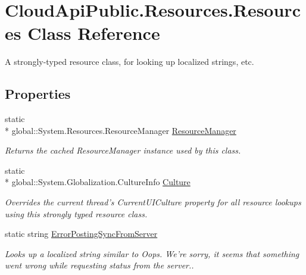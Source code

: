 \hypertarget{class_cloud_api_public_1_1_resources_1_1_resources}{\section{Cloud\-Api\-Public.\-Resources.\-Resources Class Reference}
\label{class_cloud_api_public_1_1_resources_1_1_resources}
}


A strongly-\/typed resource class, for looking up localized strings, etc.  


\subsection*{Properties}
\begin{DoxyCompactItemize}
\item 
static \\*
global\-::\-System.\-Resources.\-Resource\-Manager \hyperlink{class_cloud_api_public_1_1_resources_1_1_resources_a8d7a2d1cd9997e51ab712cb4a16bcb5d}{Resource\-Manager}
\begin{DoxyCompactList}\small\item\em Returns the cached Resource\-Manager instance used by this class. \end{DoxyCompactList}\item 
static \\*
global\-::\-System.\-Globalization.\-Culture\-Info \hyperlink{class_cloud_api_public_1_1_resources_1_1_resources_afcce1e8e34c06f6d15a43d3936a1aa18}{Culture}
\begin{DoxyCompactList}\small\item\em Overrides the current thread's Current\-U\-I\-Culture property for all resource lookups using this strongly typed resource class. \end{DoxyCompactList}\item 
static string \hyperlink{class_cloud_api_public_1_1_resources_1_1_resources_a0c0b014f3adbc0748726c33e75f54510}{Error\-Posting\-Sync\-From\-Server}
\begin{DoxyCompactList}\small\item\em Looks up a localized string similar to Oops. We're sorry, it seems that something went wrong while requesting status from the server.. \end{DoxyCompactList}\item 

\end{DoxyCompactItemize}
